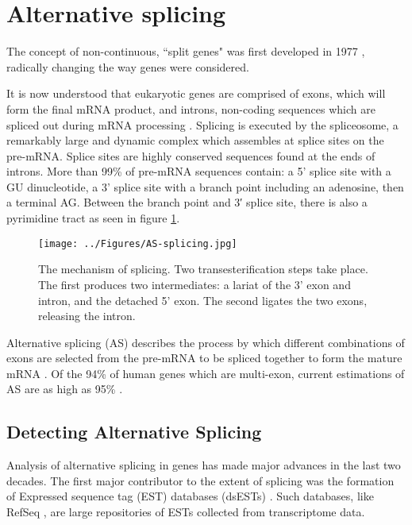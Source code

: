 \documentclass[12pt]{article}
\begin{document}
		
	\section{Alternative splicing}
		

		The concept of non-continuous, ``split genes" was first developed in 1977 \citep{Berget77}, radically changing the way genes were considered. 
			
		It is now understood that eukaryotic genes are comprised of exons, which will form the final mRNA product, and introns, non-coding sequences which are spliced out during mRNA processing \citep{Matlin05}.
		Splicing is executed by the spliceosome, a remarkably large and dynamic complex which assembles at splice sites on the pre-mRNA. 
		Splice sites are highly conserved sequences found at the ends of introns. More than 99\% of pre-mRNA sequences contain: a 5' splice site with a GU dinucleotide, a 3' splice site with a branch point including an adenosine, then a terminal AG. Between the branch point and 3′ splice site, there is also a pyrimidine tract \citep{Black03,Vanderfeltz12} as seen in figure \ref{fig:AS-splicing}. 

			\begin{figure}[b] %
				\centering
				\texttt{[image: ../Figures/AS-splicing.jpg]}
				\caption{The mechanism of splicing. Two transesterification steps take place. The first produces two intermediates: a lariat of the 3' exon and intron, and the detached 5' exon. The second ligates the two exons, releasing the intron. \citep[Figure sourced:][]{Black03}}
				\label{fig:AS-splicing}
			\end{figure}
		
		Alternative splicing (AS) describes the process by which different combinations of exons are selected from the pre-mRNA to be spliced together to form the mature mRNA  \citep{Garcia-Blanco04}. 
		Of the 94\% of human genes which are multi-exon, current estimations of AS are as high as 95\% \citep{Pan08,Wang08}. 
			
		

		
		\subsection{Detecting Alternative Splicing}
		
				
			Analysis of alternative splicing in genes has made major advances in the last two decades. The first major contributor to the extent of splicing was the formation of Expressed sequence tag (EST) databases (dsESTs) \citep{Parkinson09}. Such databases, like RefSeq \citep{Pruitt14}, are large repositories of ESTs collected from transcriptome data. 
			
\end{document}
